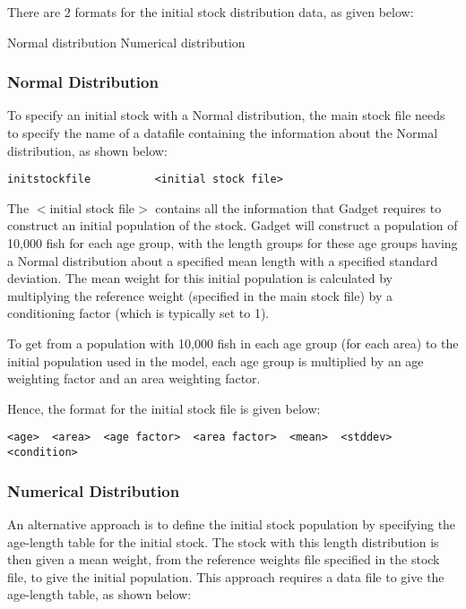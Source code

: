 \documentclass [a4paper, 10pt]{book}
\begin{document}
\bigskip
There are 2 formats for the initial stock distribution data, as given below:

\bigskip
Normal distribution\newline
Numerical distribution

\subsubsection{Normal Distribution}
To specify an initial stock with a Normal distribution, the main stock file needs to specify the name of a datafile containing the information about the Normal distribution, as shown below:

{\small\begin{verbatim}
initstockfile          <initial stock file>
\end{verbatim}}

The $<$initial stock file$>$ contains all the information that Gadget requires to construct an initial population of the stock.  Gadget will construct a population of 10,000 fish for each age group, with the length groups for these age groups having a Normal distribution about a specified mean length with a specified standard deviation.  The mean weight for this initial population is calculated by multiplying the reference weight (specified in the main stock file) by a conditioning factor (which is typically set to 1).

\bigskip
To get from a population with 10,000 fish in each age group (for each area) to the initial population used in the model, each age group is multiplied by an age weighting factor and an area weighting factor.

\bigskip
Hence, the format for the initial stock file is given below:

{\small\begin{verbatim}
<age>  <area>  <age factor>  <area factor>  <mean>  <stddev>  <condition>
\end{verbatim}}

\subsubsection{Numerical Distribution}
An alternative approach is to define the initial stock population by specifying the age-length table for the initial stock.  The stock with this length distribution is then given a mean weight, from the reference weights file specified in the stock file, to give the initial population.  This approach requires a data file to give the age-length table, as shown below:
\end{document}
